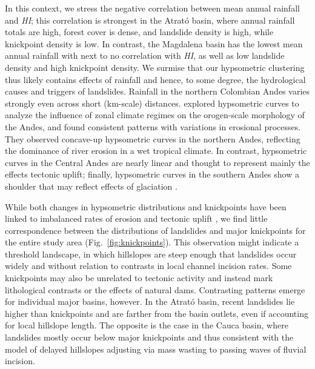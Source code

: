 \documentclass[draft]{agujournal2019}
\begin{document}
\par In this context, we stress the negative correlation between mean annual rainfall and \textit{HI}; this correlation is strongest in the Atrató basin, where annual rainfall totals are high, forest cover is dense, and landslide density is high, while knickpoint density is low. In contrast, the Magdalena basin has the lowest mean annual rainfall with next to no correlation with \textit{HI}, as well as low landslide density and high knickpoint density. We surmise that our hypsometric clustering thus likely contains effects of rainfall and hence, to some degree, the hydrological causes and triggers of landslides. Rainfall in the northern Colombian Andes varies strongly even across short (km-scale) distances.  explored hypsometric curves to analyze the influence of zonal climate regimes on the orogen-scale morphology of the Andes, and found consistent patterns with variations in erosional processes. They observed concave-up hypsometric curves in the northern Andes, reﬂecting the dominance of river erosion in a wet tropical climate. In contrast, hypsometric curves in the Central Andes are nearly linear and thought to represent mainly the effects tectonic uplift; finally, hypsometric curves in the southern Andes show a shoulder that may reflect effects of glaciation \cite{montgomery2001climate}.

\par While both changes in hypsometric distributions and knickpoints have been linked to imbalanced rates of erosion and tectonic uplift \cite{perez-pena2009}, we find little correspondence between the distributions of landslides and major knickpoints for the entire study area (Fig.~\ref{fig:knickpoints}). This observation might indicate a threshold landscape, in which hillslopes are steep enough that landslides occur widely and without relation to contrasts in local channel incision rates. Some knickpoints may also be unrelated to tectonic activity and instead mark lithological contrasts or the effects of natural dams. Contrasting patterns emerge for individual major basins, however. In the Atrató basin, recent landslides lie higher than knickpoints and are farther from the basin outlets, even if accounting for local hillslope length. The opposite is the case in the Cauca basin, where landslides mostly occur below major knickpoints and thus consistent with the model of delayed hillslopes adjusting via mass wasting to passing waves of fluvial incision. 
\end{document}
